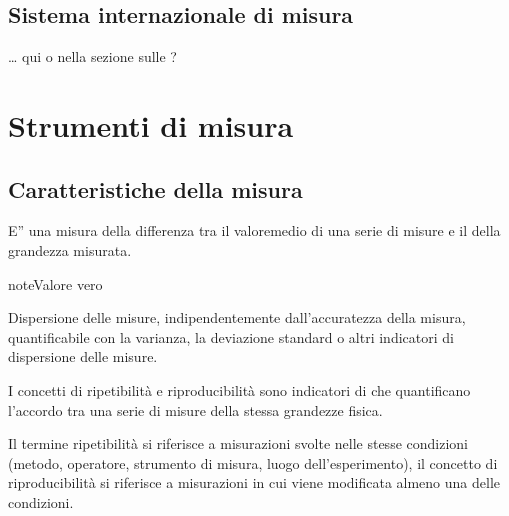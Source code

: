\documentclass[letterpaper,10pt,italian]{jupyterBook}
\begin{document}
\subsection{Sistema internazionale di misura}
\label{\detokenize{ch/intro/measurements:sistema-internazionale-di-misura}}
\sphinxAtStartPar
… qui o nella sezione sulle {\hyperref[\detokenize{ch/intro/physical_quantities:physics-hs-intro-physical-quantities}]{}}?


\section{Strumenti di misura}
\label{\detokenize{ch/intro/measurements:strumenti-di-misura}}\label{\detokenize{ch/intro/measurements:physics-hs-intro-measurements-instruments}}

\subsection{Caratteristiche della misura}
\label{\detokenize{ch/intro/measurements:caratteristiche-della-misura}}\label{\detokenize{ch/intro/measurements:physics-hs-intro-measurements-instruments-characteristics}}
\sphinxAtStartPar
{} E” una misura della differenza tra il valoremedio di una serie di misure e il  della grandezza misurata.

\begin{sphinxadmonition}{note}{Valore vero}

\sphinxAtStartPar
{}
\end{sphinxadmonition}

\sphinxAtStartPar
{} Dispersione delle misure, indipendentemente dall’accuratezza della misura, quantificabile con la varianza, la deviazione standard o altri indicatori di dispersione delle misure.

\sphinxAtStartPar
{} I concetti di ripetibilità e riproducibilità sono indicatori di  che quantificano l’accordo tra una serie di misure della stessa grandezze fisica.

\sphinxAtStartPar
Il termine ripetibilità si riferisce a misurazioni svolte nelle stesse condizioni (metodo, operatore, strumento di misura, luogo dell’esperimento), il concetto di riproducibilità si riferisce a misurazioni in cui viene modificata almeno una delle condizioni.
\end{document}
